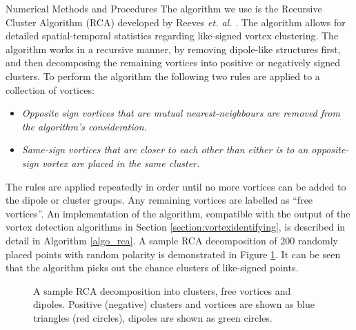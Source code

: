 \begin{chapter}{\label{cha:numerics}Numerical Methods and Procedures}
The algorithm we use is the Recursive Cluster Algorithm (RCA) developed by Reeves {\it et. al.} \cite{reeves_billam_13, reeves}. The algorithm allows for detailed spatial-temporal statistics regarding like-signed vortex clustering. The algorithm works in a recursive manner, by removing dipole-like structures first, and then decomposing the remaining vortices into positive or negatively signed clusters. To perform the algorithm the following two rules are applied to a collection of vortices:
\begin{itemize}
\item {\it Opposite sign vortices that are mutual nearest-neighbours are removed from the algorithm's consideration.}
\item {\it Same-sign vortices that are closer to each other than either is to an opposite-sign vortex are placed in the same cluster.}
\end{itemize}
The rules are applied repeatedly in order until no more vortices can be added to the dipole or cluster groups. Any remaining vortices are labelled as ``free vortices''. An implementation of the algorithm, compatible with the output of the vortex detection algorithms in Section \ref{section:vortexidentifying}, is described in detail in Algorithm \ref{algo_rca}. A sample RCA decomposition of 200 randomly placed points with random polarity is demonstrated in Figure \ref{fig:rca}. It can be seen that the algorithm picks out the chance clusters of like-signed points. 

\begin{figure}[!ht]
\centering
\caption{A sample RCA decomposition into clusters, free vortices and dipoles. Positive (negative) clusters and vortices are shown as blue triangles (red circles), dipoles are shown as green circles.}\label{fig:rca}
\end{figure}


\end{chapter}
